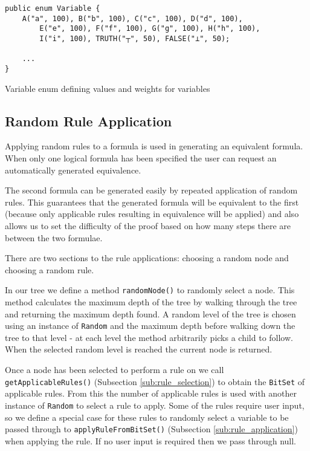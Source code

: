 \documentclass{report}
\begin{document}
\begin{listing}[ht]
\begin{verbatim}
public enum Variable {
    A("a", 100), B("b", 100), C("c", 100), D("d", 100), 
        E("e", 100), F("f", 100), G("g", 100), H("h", 100), 
        I("i", 100), TRUTH("┬", 50), FALSE("⊥", 50);

    ...
}
\end{verbatim}
\caption{Variable enum defining values and weights for variables}
\label{variableenum}
\end{listing}

\subsection{Random Rule Application}

Applying random rules to a formula is used in generating an equivalent formula. When only one logical formula has been specified the user can request an automatically generated equivalence.

The second formula can be generated easily by repeated application of random rules. This guarantees that the generated formula will be equivalent to the first (because only applicable rules resulting in equivalence will be applied) and also allows us to set the difficulty of the proof based on how many steps there are between the two formulae.

There are two sections to the rule applications: choosing a random node and choosing a random rule. 

In our tree we define a method {\tt randomNode()} to randomly select a node. This method calculates the maximum depth of the tree by walking through the tree and returning the maximum depth found. A random level of the tree is chosen using an instance of {\tt Random} and the maximum depth before walking down the tree to that level - at each level the method arbitrarily picks a child to follow. When the selected random level is reached the current node is returned.

Once a node has been selected to perform a rule on we call {\tt getApplicableRules()} (Subsection \ref{sub:rule_selection}) to obtain the {\tt BitSet} of applicable rules. From this the number of applicable rules is used with another instance of {\tt Random} to select a rule to apply. Some of the rules require user input, so we define a special case for these rules to randomly select a variable to be passed through to {\tt applyRuleFromBitSet()} (Subsection \ref{sub:rule_application}) when applying the rule. If no user input is required then we pass through null.
\end{document}
